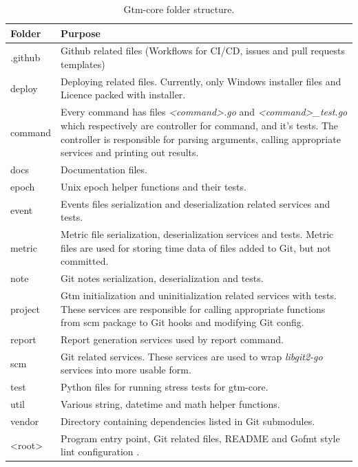 \begin{table}[h]
    \centering
    \begin{tabular}{ | p{3cm} | p{10cm} |}
        \hline
        \textbf{Folder} & \textbf{Purpose}\\
        \hline
        .github & Github related files (Workflows for CI/CD, issues and pull requests templates)\\
        \hline
        deploy & Deploying related files.
        Currently, only Windows installer files and Licence packed with installer.\\
        \hline
        command & Every command has files \textit{<command>.go} and \textit{<command>\_test.go} which respectively are controller for command, and it's tests.
        The controller is responsible for parsing arguments, calling appropriate services and printing out results.\\
        \hline
        docs & Documentation files.\\
        \hline
        epoch & Unix epoch helper functions and their tests.\\
        \hline
        event & Events files serialization and deserialization related services and tests.\\
        \hline
        metric & Metric file serialization, deserialization services and tests.
        Metric files are used for storing time data of files added to Git, but not committed.\\
        \hline
        note & Git notes serialization, deserialization and tests.\\
        \hline
        project & Gtm initialization and uninitialization related services with tests.
        These services are responsible for calling appropriate functions from scm package to Git hooks and modifying Git config.\\
        \hline
        report & Report generation services used by report command.\\
        \hline
        scm & Git related services.
        These services are used to wrap \textit{libgit2-go} services into more usable form.\\
        \hline
        test & Python files for running stress tests for gtm-core.\\
        \hline
        util & Various string, datetime and math helper functions.\\
        \hline
        vendor & Directory containing dependencies listed in Git submodules.\\
        \hline
        <root> & Program entry point, Git related files, README and Gofmt style lint configuration .\\
        \hline
    \end{tabular}
    \caption{Gtm-core folder structure.}
    \label{tab:gtm-core-folder-structure}
\end{table}

